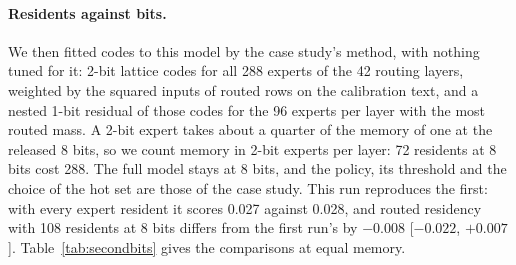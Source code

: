 \documentclass[11pt]{article}
\newcommand{\ci}[2]{[$#1$, $#2$]}
\begin{document}
\paragraph{Residents against bits.} We then fitted codes to this model by the case study's
method, with nothing tuned for it: 2-bit lattice codes for all 288 experts of the 42 routing
layers, weighted by the squared inputs of routed rows on the calibration text, and a nested
1-bit residual of those codes for the 96 experts per layer with the most routed mass. A 2-bit
expert takes about a quarter of the memory of one at the released 8 bits, so we count memory in
2-bit experts per layer: 72 residents at 8 bits cost 288. The full model stays at 8 bits, and
the policy, its threshold and the choice of the hot set are those of the case study. This run
reproduces the first: with every expert resident it scores 0.027 against 0.028, and routed
residency with 108 residents at 8 bits differs from the first run's by $-0.008$
\ci{-0.022}{+0.007}. Table~\ref{tab:secondbits} gives the comparisons at equal memory.
\end{document}
